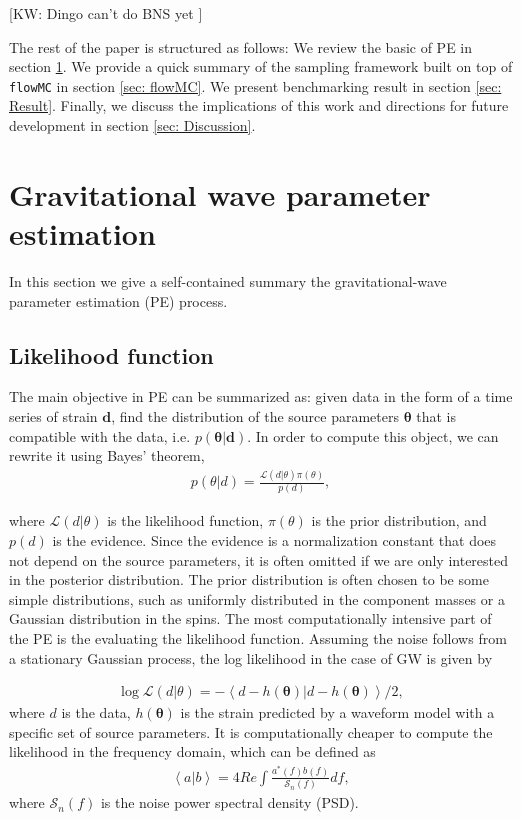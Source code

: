 \documentclass[twocolumn]{aastex631}
\newcommand{\kw}[1]{{\color{rb4}[KW: #1 ]}}
\begin{document}

\kw{Dingo can't do BNS yet}


The rest of the paper is structured as follows: We review the basic of PE in
section \ref{sec: PE}. We provide a quick summary of the sampling framework
built on top of \texttt{flowMC} in section \ref{sec: flowMC}. We present
benchmarking result in section \ref{sec: Result}. Finally, we discuss the
implications of this work and directions for future development in section
\ref{sec: Discussion}.

\section{Gravitational wave parameter estimation}
\label{sec: PE}

In this section we give a self-contained summary the gravitational-wave
parameter estimation (PE) process.

\subsection{Likelihood function}
\label{sec:likelihood}

The main objective in PE can be summarized as: given data in the form of a time
series of strain $\mathbf{d}$, find the distribution of the source parameters
$\mathbf{\theta}$ that is compatible with the data, i.e.
$p(\mathbf{\theta}|\mathbf{d})$. In order to compute this object, we can rewrite
it using Bayes' theorem,
\begin{align}
    p(\theta| d) = \frac{\mathcal{L}(d|\theta)\pi(\theta)}{p(d)},
\end{align}

where $\mathcal{L}(d|\theta)$ is the likelihood function, $\pi(\theta)$ is the
prior distribution, and $p(d)$ is the evidence. Since the evidence is a
normalization constant that does not depend on the source parameters, it is
often omitted if we are only interested in the posterior distribution. The prior
distribution is often chosen to be some simple distributions, such as uniformly
distributed in the component masses or a Gaussian distribution in the spins.
The most computationally intensive part of the PE is the evaluating the likelihood function.
Assuming the noise follows from a stationary Gaussian process, the log likelihood in the case of GW is given by

\begin{align}
    \log{\mathcal{L}(d|\theta)} = -\left<d-h(\mathbf{\theta})|d-h(\mathbf{\theta})\right>/2,
\label{eq: loglikelihood}
\end{align}
where $d$ is the data, $h(\mathbf{\theta})$ is the strain predicted by a waveform model with a specific set of source parameters.
It is computationally cheaper to compute the likelihood in the frequency domain, which can be defined as 
\begin{align}
    \left<a|b\right> = 4 Re\int \frac{a^*(f)b(f)}{\mathcal{S}_n(f)} df,
\label{eq: innerproduct}
\end{align}
where $\mathcal{S}_n(f)$ is the noise power spectral density (PSD).
\end{document}
